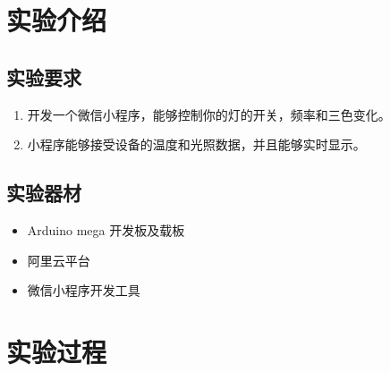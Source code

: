 \documentclass[12pt,hyperref,a4paper,UTF8]{ctexart}
\begin{document}
\cover

%
%

\thispagestyle{empty} %

\newpage
\tableofcontents

\newpage


\section{实验介绍}
\subsection{实验要求}

\begin{enumerate}
  \item 开发一个微信小程序，能够控制你的灯的开关，频率和三色变化。
  \item 小程序能够接受设备的温度和光照数据，并且能够实时显示。
\end{enumerate}
\subsection{实验器材}
\begin{itemize}[itemsep=-5pt, topsep=0pt, partopsep=0pt]
    \item Arduino mega 开发板及载板
    \item 阿里云平台
    \item 微信小程序开发工具
\end{itemize}


\section{实验过程}
\end{document}
